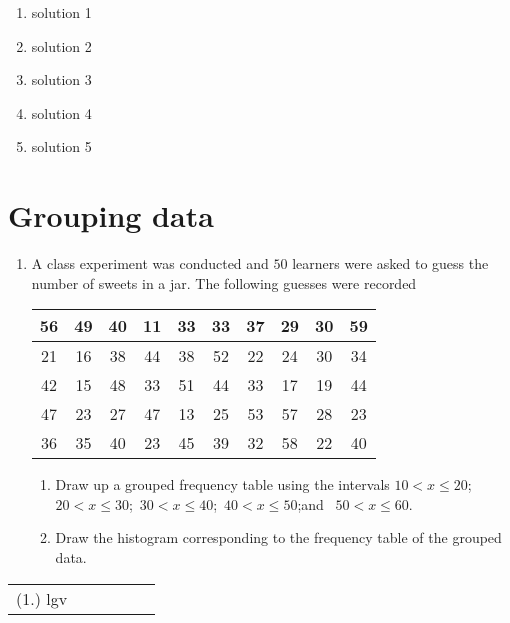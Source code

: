  \begin{solutions}{}{
\begin{enumerate}[itemsep=5pt, label=\textbf{\arabic*}. ] 


\item solution 1
\item solution 2
\item solution 3
\item solution 4
\item solution 5

\end{enumerate}}
\end{solutions}


\section{Grouping data}
\begin{exercises}{}{
    \begin{enumerate}[itemsep=5pt, label=\textbf{\arabic*}. ]
    \item  A class experiment was conducted and $50$ learners were asked to
      guess the number of sweets in a jar. The following guesses were
      recorded
      \\
      \begin{center}
        \begin{tabular}{|c|c|c|c|c|c|c|c|c|c|} \hline
          56 & 49 & 40 & 11 & 33 & 33 & 37 & 29 & 30 & 59 \\ \hline
          21 & 16 & 38 & 44 & 38 & 52 & 22 & 24 & 30 & 34 \\\hline
          42 & 15 & 48 & 33 & 51 & 44 & 33 & 17 & 19 & 44 \\\hline
          47 & 23 & 27 & 47 & 13 & 25 & 53 & 57 & 28 & 23 \\\hline
          36 & 35 & 40 & 23 & 45 & 39 & 32 & 58 & 22 & 40 \\\hline
        \end{tabular}
      \end{center}
      \begin{enumerate}[noitemsep, label=\textbf{(\alph*)} ]
      \item
        Draw up a grouped frequency table using the intervals
        $10 < x \le 20$;\ $20 < x \le 30$;\ $30 < x \le 40$;\ 
        $40 < x \le 50$;and \ $50 < x \le 60$.
      \item Draw the histogram corresponding to the frequency table of the
        grouped data.
      \end{enumerate}
    \end{enumerate}
\practiceinfo
\par 
\par \begin{tabular}[h]{cccccc}
(1.) lgv & \end{tabular}
}
\end{exercises}


